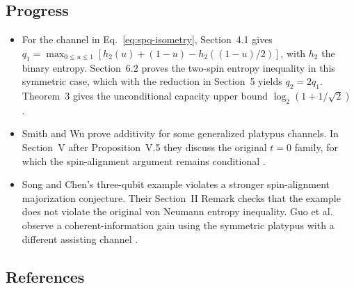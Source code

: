 \subsection*{Progress}

\begin{itemize}
  \item For the channel in Eq.~\eqref{eq:spq-isometry}, Section~4.1 gives $q_1=\max_{0\leq u\leq1}[h_2(u)+(1-u)-h_2((1-u)/2)]$, with $h_2$ the binary entropy. Section~6.2 proves the two-spin entropy inequality in this symmetric case, which with the reduction in Section~5 yields $q_2=2q_1$. Theorem~3 gives the unconditional capacity upper bound $\log_2(1+1/\sqrt{2})$ .

  \item Smith and Wu prove additivity for some generalized platypus channels. In Section~V after Proposition~V.5 they discuss the original $t=0$ family, for which the spin-alignment argument remains conditional .

  \item Song and Chen's three-qubit example violates a stronger spin-alignment majorization conjecture. Their Section~II Remark checks that the example does not violate the original von Neumann entropy inequality. Guo et al. observe a coherent-information gain using the symmetric platypus with a different assisting channel  .
\end{itemize}

\subsection*{References}

